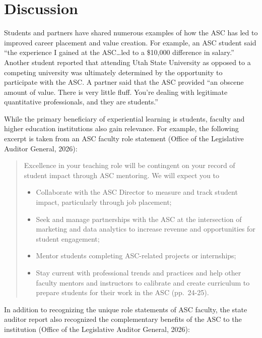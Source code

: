 \documentclass[
  12pt]{article}
\providecommand{\tightlist}{%
  \setlength{\itemsep}{0pt}\setlength{\parskip}{0pt}}
\begin{document}
\section{Discussion}\label{sec-discussion}

Students and partners have shared numerous examples of how the ASC has
led to improved career placement and value creation. For example, an ASC
student said ``the experience I gained at the ASC\ldots led to a
\$10,000 difference in salary.'' Another student reported that attending
Utah State University as opposed to a competing university was
ultimately determined by the opportunity to participate with the ASC. A
partner said that the ASC provided ``an obscene amount of value. There
is very little fluff. You're dealing with legitimate quantitative
professionals, and they are students.''

While the primary beneficiary of experiential learning is students,
faculty and higher education institutions also gain relevance. For
example, the following excerpt is taken from an ASC faculty role
statement (Office of the Legislative Auditor General, 2026):

\begin{quote}
Excellence in your teaching role will be contingent on your record of
student impact through ASC mentoring. We will expect you to

\begin{itemize}
\tightlist
\item
  Collaborate with the ASC Director to measure and track student impact,
  particularly through job placement;
\item
  Seek and manage partnerships with the ASC at the intersection of
  marketing and data analytics to increase revenue and opportunities for
  student engagement;
\item
  Mentor students completing ASC-related projects or internships;
\item
  Stay current with professional trends and practices and help other
  faculty mentors and instructors to calibrate and create curriculum to
  prepare students for their work in the ASC (pp.~24-25).
\end{itemize}
\end{quote}

In addition to recognizing the unique role statements of ASC faculty,
the state auditor report also recognized the complementary benefits of
the ASC to the institution (Office of the Legislative Auditor General,
2026):
\end{document}
